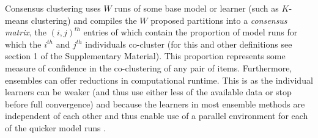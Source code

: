 \documentclass{bmcart}
\begin{document}
Consensus clustering uses $W$ runs of some base model or learner (such as $K$-means clustering) and compiles the $W$ proposed partitions into a \emph{consensus matrix}, the $(i, j)^{th}$ entries of which contain the proportion of model runs for which the $i^{th}$ and $j^{th}$ individuals co-cluster (for this and other definitions see section 1 of the Supplementary Material). This proportion represents some measure of confidence in the co-clustering of any pair of items. Furthermore, ensembles can offer reductions in computational runtime. This is as the individual learners can be weaker (and thus use either less of the available data or stop before full convergence) and because the learners in most ensemble methods are independent of each other and thus enable use of a parallel environment for each of the quicker model runs \citep{ghaemi2009survey}. 

\end{document}
